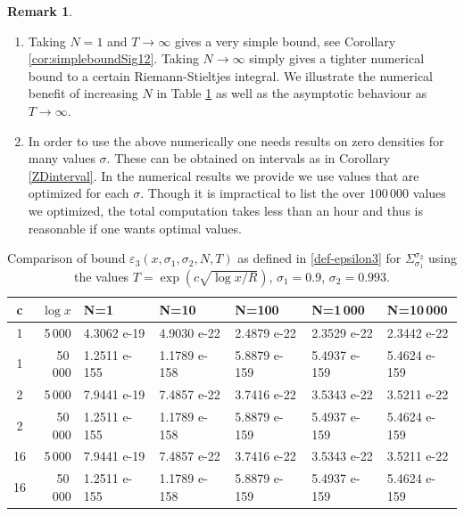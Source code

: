 \documentclass[10pt]{amsart}
\newcommand{\s}{\sigma}
\theoremstyle{definition}
\newtheorem{Rem}[prop]{Remark}
\numberwithin{equation}{section}
\begin{document}
\begin{Rem}\ \noindent
\begin{enumerate}
\item
Taking $N=1$ and $T\to\infty$ gives a very simple bound, see Corollary \ref{cor:simpleboundSig12}.
Taking $N\to \infty$ simply gives a tighter numerical bound to a certain Riemann-Stieltjes integral. We illustrate the numerical benefit of increasing $N$ in Table \ref{table:comparisonSi12} as well as the asymptotic behaviour as $T\to \infty$.
\item 
In order to use the above numerically one needs results on zero densities for many values $\s$. These can be obtained on intervals as in Corollary \ref{ZDinterval}.
In the numerical  results we provide we use values that are optimized for each $\s$.
Though it is impractical to list the over $100\,000$ values we optimized, the total computation takes less than an hour and thus is reasonable if one wants optimal values.
\end{enumerate}
\end{Rem}
%
\begin{table}[t]
\caption{Comparison of bound $\varepsilon_3(x,\s_1,\s_2,N,T)$ as defined in \eqref{def-epsilon3} for $\Sigma_{\s_1}^{\s_2}$ using the values $T=\exp(c\sqrt{\log x/R})$, $\s_1=0.9$, $\s_2=0.993$.}
\label{table:comparisonSi12}
{
\begin{tabular}{|c|r|lllll|}
\hline
c & $\log x$ &  N=1 & N=10 & N=100  & N=1\,000 & N=10\,000 \\
\hline
1 & 5\,000 & 4.3062 e-19 & 4.9030 e-22 & 2.4879 e-22 & 2.3529 e-22 & 2.3442 e-22 \\
1 & 50\,000 & 1.2511 e-155 & 1.1789 e-158 & 5.8879 e-159 & 5.4937 e-159 & 5.4624 e-159 \\
\hline
2 & 5\,000 & 7.9441 e-19 & 7.4857 e-22 & 3.7416 e-22 & 3.5343 e-22 & 3.5211 e-22 \\
2 & 50\,000 & 1.2511 e-155 & 1.1789 e-158 & 5.8879 e-159 & 5.4937 e-159 & 5.4624 e-159 \\
\hline
16 & 5\,000 & 7.9441 e-19 & 7.4857 e-22 & 3.7416 e-22 & 3.5343 e-22 & 3.5211 e-22 \\
16 & 50\,000 & 1.2511 e-155 & 1.1789 e-158 & 5.8879 e-159 & 5.4937 e-159 & 5.4624 e-159 \\
\hline
\end{tabular}
}
\end{table}
\end{document}
